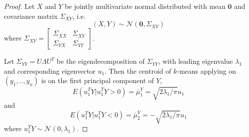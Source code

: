 \documentclass[12pt]{article}
\begin{document}
\begin{proof}
Let $X$ and $Y$ be jointly multivariate normal distributed with mean $\mathbf{0}$ and covariance matrix $\Sigma_{XY}$, i.e.
\[	(X,Y) \sim \mathcal{N} \left( \mathbf{0}, \Sigma_{XY}\right)	\]
where $\Sigma_{XY}=\begin{bmatrix} \Sigma_{XX} & \Sigma_{XY} \\  \Sigma_{YX} & \Sigma_{YY} \end{bmatrix}$.

Let $\Sigma_{YY} = U \Lambda U^T$  be the eigendecomposition of $\Sigma_{YY}$,
with leading eigenvalue $\lambda_1$ and corresponding eigenvector $u_1$. Then
the centroid of $k$-means applying on $(y_1,..,y_n)$ is on the first principal
component
of $Y$,\[	E(u^T_1 Y|u^T_1 Y>0) = \bar{\mu}^Y_1 =\sqrt{2 \lambda_1/\pi}u_1\] and 
\[	E(u^T_1 Y|u^T_1 Y<0) = \bar{\mu}^Y_2 =-\sqrt{2 \lambda_1/\pi}u_1\]
 where $u^T_1 Y \sim \mathcal{N}(0,\lambda_1)$.


\end{proof}
\end{document}
